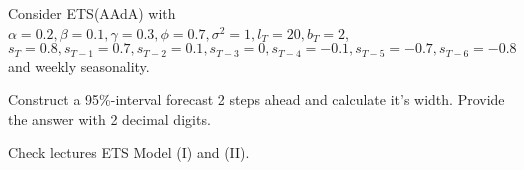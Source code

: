 
\begin{question}
Consider ETS(AAdA) with \(\alpha=0.2, \beta=0.1, \gamma=0.3, \phi=0.7, \sigma^2=1, l_T = 20, b_T = 2\), \(s_{T} = 0.8, s_{T-1} = 0.7, s_{T-2} = 0.1, s_{T-3} = 0, s_{T-4} = -0.1, s_{T-5} = -0.7, s_{T-6} = -0.8\) and weekly seasonality.

Construct a 95\%-interval forecast 2 steps ahead and calculate it's width.
Provide the answer with 2 decimal digits.
\end{question}

\begin{solution}
Check lectures ETS Model (I) and (II).
\end{solution}

